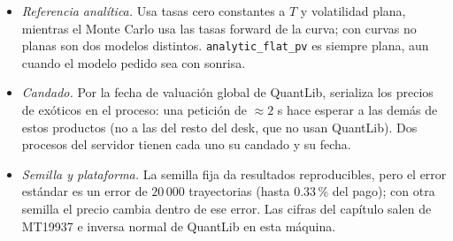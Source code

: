 \begin{limites}
\begin{itemize}
          el reprecio nunca cruza una barrera (hallazgo H23, sección~\ref{sec:cap15-ej-griegas}). Con la barrera a menos de $2\,\%$ del spot la delta es entonces una diferencia sobre un paso
          pequeño (a $0.1\,\%$, un choque de $0.05\,\%$ del spot) y su ruido relativo crece como $1/h_X$; la prueba del repositorio exige que quede a menos de $\max\{10\,\%,3\,\mathrm{se}/h_X\}$ de la forma cerrada con
          el mismo choque, y con una barrera a $0.1$, $0.5$ y $2\,\%$ del spot la diferencia medida es de a lo más $1.7\,\%$ (sección~\ref{sec:cap15-ej-griegas}). La delta es además a volatilidad fija en strike.
    \item \emph{Referencia analítica.} Usa tasas cero constantes a $T$ y volatilidad plana, mientras el Monte Carlo usa las tasas forward de la curva; con curvas
          no planas son dos modelos distintos. \texttt{analytic\_flat\_pv} es siempre plana, aun cuando el modelo pedido sea con sonrisa.
    \item \emph{Candado.} Por la fecha de valuación global de QuantLib,  serializa los precios de exóticos en el
          proceso: una petición de $\approx2$ s hace esperar a las demás de estos productos (no a las del resto del desk, que no usan QuantLib). Dos procesos del servidor
          tienen cada uno su candado y su fecha.
    \item \emph{Semilla y plataforma.} La semilla fija da resultados reproducibles, pero el error estándar es un error de $20\,000$ trayectorias (hasta
          $0.33\,\%$ del pago); con otra semilla el precio cambia dentro de ese error. Las cifras del capítulo salen de MT19937 e inversa normal de QuantLib en esta máquina.
  \end{itemize}
\end{limites}

